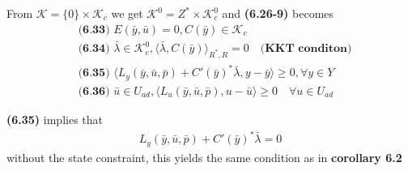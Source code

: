 From $\mathcal{K} = \{0\} \times \mathcal{K}_c$ we get $\mathcal{K}^0 = Z^* \times \mathcal{K}_c^0$ and \textbf{(6.26-9)} becomes
\begin{align*}
	&\textbf{(6.33) }E(\bar{y}, \bar{u}) = 0, C(\bar{y}) \in \mathcal{K}_c\\
	&\textbf{(6.34) }\bar{\lambda} \in \mathcal{K}_c^0, \langle \bar{\lambda}, C(\bar{y}) \rangle_{R^*, R} = 0 \quad \textbf{(KKT conditon)} \\
	&\textbf{(6.35) }\langle L_y(\bar{y}, \bar{u}, \bar{p}) + C'(\bar{y})^* \bar{\lambda}, y - \bar{y} \rangle \geq 0, \forall y \in Y\\
	&\textbf{(6.36) }\bar{u} \in U_{ad}, \langle L_u(\bar{y}, \bar{u}, \bar{p}), u - \bar{u} \rangle \geq 0 \quad \forall u \in U_{ad}
\end{align*}
\begin{remark}
\textbf{(6.35)} implies that 
\begin{align*}
	L_y(\bar{y}, \bar{u}, \bar{p}) + C'(\bar{y})^* \bar{\lambda} = 0
\end{align*}	
without the state constraint, this yields the same condition as in  \textbf{corollary 6.2}
\end{remark}

